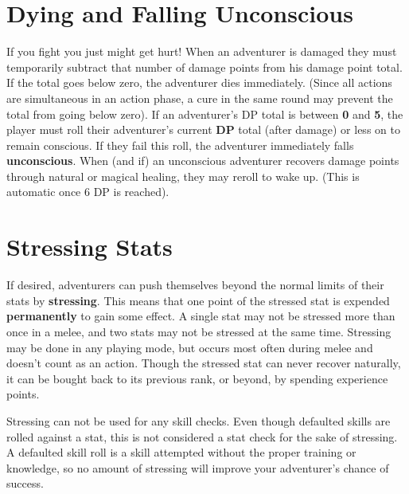 \begin{multicols*}{2}
\section{Dying and Falling Unconscious}
If you fight you just might get hurt! When an adventurer is damaged they must temporarily subtract that number of damage points from his damage point total. If the total goes below zero, the adventurer dies immediately. (Since all actions are simultaneous in an action phase, a cure in the same round may prevent the total from going below zero).
If an adventurer's DP total is between \textbf{0} and \textbf{5}, the
player must roll their adventurer's current \textbf{DP} total (after damage) or less on  to remain conscious. If they fail this roll, the adventurer immediately falls \textbf{unconscious}. When (and if) an unconscious adventurer recovers damage points through natural or magical healing, they may reroll to wake up. (This is automatic once 6 DP is reached).
\section{Stressing Stats}
If desired, adventurers can push themselves beyond the normal limits of their stats by \textbf{stressing}. This means that one point of the stressed stat is expended \textbf{permanently} to gain some effect. A single stat may not be stressed more than once in a melee, and two stats may not be stressed at the same time. Stressing may be done in any playing mode, but occurs most often during melee and doesn't count as an action. Though the stressed stat can never recover naturally, it can be bought back to its previous rank, or beyond, by spending experience points.

Stressing can not be used for any skill checks. Even though defaulted skills are rolled against a stat, this is not considered a stat check for the sake of stressing. A defaulted skill roll is a skill attempted without the proper training or knowledge, so no amount of stressing will improve your adventurer's chance of success.


\end{multicols*}
